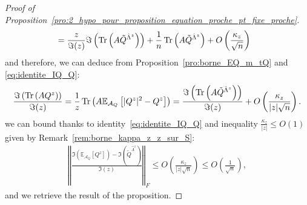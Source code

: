 \documentclass[a4papaer, titlepage]{book}
\begin{document}
\begin{proof}[Proof of Proposition~\ref{pro:2_hypo_pour_proposition_equation_proche_pt_fixe_proche}]
\begin{align*}
    &= \frac{z}{\Im(z)} \Im \left(\operatorname{Tr} \left(A \tilde Q^{\hat \Lambda^z}\right) \right) + \frac{1}{n} \operatorname{Tr} \left(A \tilde Q^{\hat \Lambda^z}\right)  + O \left(\frac{\kappa_z}{\sqrt{n}}\right)
    \end{align*}
    and therefore, we can deduce from Proposition~\ref{pro:borne_EQ_m_tQ} and \eqref{eq:identite_IQ_Q}:
    \begin{align*}
      \frac{\Im \left(\operatorname{Tr} \left(A Q^{z}\right)\right)}{\Im(z)} = \frac{1}{z}\operatorname{Tr} \left(A \mathbb E_{\mathcal A_Q} \left[|Q^z|^2 - Q^z\right]\right) = \frac{\Im \left(\operatorname{Tr} \left(A \tilde Q^{\hat \Lambda^z}\right)\right)}{\Im(z)} + O \left(\frac{\kappa_z}{|z|\sqrt{n}}\right).
    \end{align*}
  we can bound thanks to identity~\ref{eq:identite_IQ_Q} and inequality $\frac{\kappa_z}{|z|} \leq O(1)$ given by Remark~\ref{rem:borne_kappa_z_z_sur_S}:
  \begin{align*}
    \left\Vert \frac{\Im( \mathbb{E}_{\mathcal A_Q} \left[Q^z\right]) - \Im(\tilde Q ^{\hat \Lambda^z})}{\Im(z)} \right\Vert_F \leq  O \left(\frac{\kappa_z}{|z|\sqrt{n}}\right)\leq O \left(\frac{1}{\sqrt{n}}\right),
  \end{align*}
  and we retrieve the result of the proposition.
\end{proof}
\end{document}
